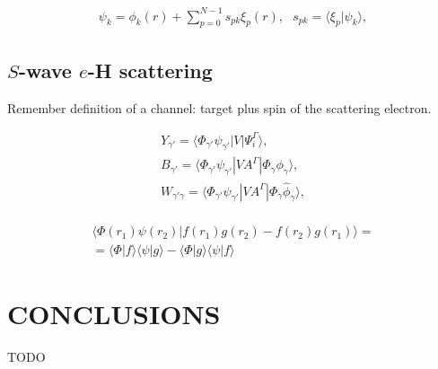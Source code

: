 \documentclass[aip
, pra
, showpacs
, aps
, twocolumn
, groupedaddress
, floatfix
]{revtex4}
\newcommand{\beq}{\begin{equation}}
\newcommand{\eeq}{\end{equation}}
\newcommand{\barr}{\begin{array}}
\newcommand{\earr}{\end{array}}
\begin{document}
\beq \barr{l}
\psi_k = \phi_k(r) +  \sum_{p=0}^{N-1} s_{pk} \xi_p(r), \ \ \ s_{pk} = \langle \xi_p | \psi_k \rangle,
\earr \label{Psi_} \eeq


\subsection{$S$-wave $e$-H scattering}

Remember definition of a channel: target plus spin of the scattering electron.


\beq \barr{l}
Y_{\gamma'} = \langle \Phi_{\gamma'}  \psi_{\gamma'} |V|\Psi_i^{\Gamma} \rangle,\\
B_{\gamma'} = \langle  \Phi_{\gamma'}  \psi_{\gamma'} |VA^{\Gamma} |\Phi_{\gamma} \phi_{\gamma} \rangle,\\
W_{\gamma' \gamma} = \langle \Phi_{\gamma'}  \psi_{\gamma'} |V A^{\Gamma} |\Phi_{\gamma} \widehat{\phi}_{\gamma} \rangle,\\
\earr \label{Psi_} \eeq

\beq \barr{l}
\langle  \Phi(r_1) \psi(r_2) |f(r_1) g(r_2) - f(r_2) g(r_1) \rangle = \\
=\langle  \Phi |f \rangle  \langle  \psi |g \rangle -
\langle  \Phi |g \rangle  \langle  \psi |f \rangle
\earr \eeq


\section{CONCLUSIONS}
TODO


\begin{acknowledgments}
\end{acknowledgments}





%
\end{document}
